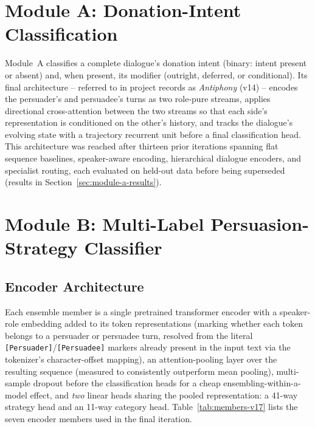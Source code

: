 \section{Module A: Donation-Intent Classification}
\label{sec:design-module-a}

Module~A classifies a complete dialogue's donation intent (binary: intent
present or absent) and, when present, its modifier (outright, deferred, or
conditional). Its final architecture -- referred to in project records as
\emph{Antiphony} (v14) -- encodes the persuader's and persuadee's turns as
two role-pure streams, applies directional cross-attention between the two
streams so that each side's representation is conditioned on the other's
history, and tracks the dialogue's evolving state with a trajectory
recurrent unit before a final classification head. This architecture was
reached after thirteen prior iterations spanning flat sequence baselines,
speaker-aware encoding, hierarchical dialogue encoders, and specialist
routing, each evaluated on held-out data before being superseded (results in
Section~\ref{sec:module-a-results}).

\section{Module B: Multi-Label Persuasion-Strategy Classifier}
\label{sec:design-module-b}

\subsection{Encoder Architecture}

Each ensemble member is a single pretrained transformer encoder with a
speaker-role embedding added to its token representations (marking whether
each token belongs to a persuader or persuadee turn, resolved from the
literal \texttt{[Persuader]}/\texttt{[Persuadee]} markers already present in
the input text via the tokenizer's character-offset mapping), an
attention-pooling layer over the resulting sequence (measured to consistently
outperform mean pooling), multi-sample dropout before the classification
heads for a cheap ensembling-within-a-model effect, and \emph{two} linear
heads sharing the pooled representation: a 41-way strategy head and an
11-way category head. Table~\ref{tab:members-v17} lists the seven encoder
members used in the final iteration.

